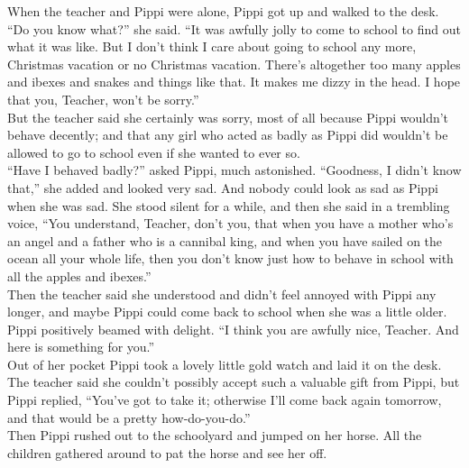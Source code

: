 \documentclass{standard}
\begin{document}
When the teacher and Pippi were alone, Pippi got up and walked to the desk. “Do you know what?” she said. “It was awfully jolly to come to school to find out what it was like. But I don’t think I care about going to school any more, Christmas vacation or no Christmas vacation. There’s altogether too many apples and ibexes and snakes and things like that. It makes me dizzy in the head. I hope that you, Teacher, won’t be sorry.”\\

But the teacher said she certainly was sorry, most of all because Pippi wouldn’t behave decently; and that any girl who acted as badly as Pippi did wouldn’t be allowed to go to school even if she wanted to ever so.\\

“Have I behaved badly?” asked Pippi, much astonished. “Goodness, I didn’t know that,” she added and looked very sad. And nobody could look as sad as Pippi when she was sad. She stood silent for a while, and then she said in a trembling voice, “You understand, Teacher, don’t you, that when you have a mother who’s an angel and a father who is a cannibal king, and when you have sailed on the ocean all your whole life, then you don’t know just how to behave in school with all the apples and ibexes.”\\

Then the teacher said she understood and didn’t feel annoyed with Pippi any longer, and maybe Pippi could come back to school when she was a little older. Pippi positively beamed with delight. “I think you are awfully nice, Teacher. And here is something for you.”\\

Out of her pocket Pippi took a lovely little gold watch and laid it on the desk. The teacher said she couldn’t possibly accept such a valuable gift from Pippi, but Pippi replied, “You’ve got to take it; otherwise I’ll come back again tomorrow, and that would be a pretty how-do-you-do.”\\

Then Pippi rushed out to the schoolyard and jumped on her horse. All the children gathered around to pat the horse and see her off.\\
\end{document}
